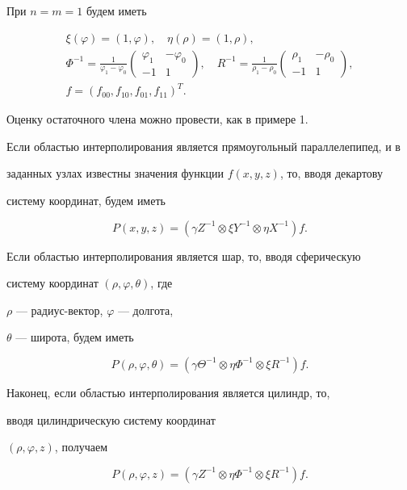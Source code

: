 \begin{exam}


При $n=m=1$ будем иметь


\begin{gather*}


\xi(\varphi)=(1,\varphi),\quad \eta(\rho)=(1,\rho), \\


%


\Phi^{-1}=\frac{1}{\varphi_{1}-\varphi_{0}}\begin{pmatrix}


\varphi_1&-\varphi_{0}\\ -1&1 \end{pmatrix},\quad


R^{-1}=\frac{1}{\rho_{1}-\rho_{0}}\begin{pmatrix}


\rho_1&-\rho_{0}\\ -1&1 \end{pmatrix},\\


%


f=(f_{00},f_{10},f_{01},f_{11})^{T}.


\end{gather*}


Оценку остаточного члена можно провести, как в примере 1.


Если областью интерполирования является прямоугольный параллелепипед, и в


заданных узлах известны значения функции $f(x,y,z)$, то, вводя декартову


систему координат, будем иметь


$$


P(x,y,z)=(\gamma Z^{-1}\otimes\xi Y^{-1}\otimes


\eta X^{-1})f.


$$





Если областью интерполирования является шар, то, вводя сферическую


систему координат $(\rho,\varphi,\theta)$, где


$\rho$ --- радиус-вектор, $\varphi$ --- долгота,


$\theta$ --- широта, будем иметь


$$


P(\rho,\varphi,\theta)=(\gamma\Theta^{-1}


\otimes\eta\Phi^{-1}\otimes\xi R^{-1})f.


$$





Наконец, если областью интерполирования является цилиндр, то,


вводя цилиндрическую систему координат


$(\rho,\varphi,z)$, получаем


$$


P(\rho,\varphi,z)=(\gamma Z^{-1}


\otimes\eta\Phi^{-1}\otimes\xi R^{-1})f.


$$


\end{exam}
